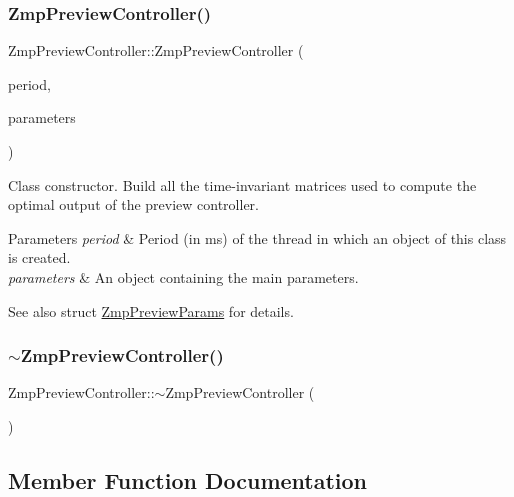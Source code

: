 \subsubsection{\texorpdfstring{Zmp\+Preview\+Controller()}{ZmpPreviewController()}}
{\footnotesize\ttfamily Zmp\+Preview\+Controller\+::\+Zmp\+Preview\+Controller (\begin{DoxyParamCaption}\item[{const int}]{period,  }\item[{struct \hyperlink{structZmpPreviewParams}{Zmp\+Preview\+Params}}]{parameters }\end{DoxyParamCaption})}

Class constructor. Build all the time-\/invariant matrices used to compute the optimal output of the preview controller. 
\begin{DoxyParams}{Parameters}
{\em period} & Period (in ms) of the thread in which an object of this class is created. \\
\hline
{\em parameters} & An object containing the main parameters. \\
\hline
\end{DoxyParams}
\begin{DoxySeeAlso}{See also}
struct \hyperlink{structZmpPreviewParams}{Zmp\+Preview\+Params} for details. 
\end{DoxySeeAlso}
\hypertarget{classZmpPreviewController_af702c45f318c7a78310d19cc061886dd}{}\label{classZmpPreviewController_af702c45f318c7a78310d19cc061886dd} 
\subsubsection{\texorpdfstring{$\sim$\+Zmp\+Preview\+Controller()}{~ZmpPreviewController()}}
{\footnotesize\ttfamily Zmp\+Preview\+Controller\+::$\sim$\+Zmp\+Preview\+Controller (\begin{DoxyParamCaption}{ }\end{DoxyParamCaption})\hspace{0.3cm}{\ttfamily [virtual]}}



\subsection{Member Function Documentation}
\hypertarget{classZmpPreviewController_a39ffdba07960f90a6cce247065f12504}{}\label{classZmpPreviewController_a39ffdba07960f90a6cce247065f12504} 
